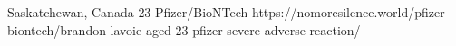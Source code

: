           {Saskatchewan, Canada}
          {23}
          {Pfizer/BioNTech}
          {}
          {
          }
          {https://nomoresilence.world/pfizer-biontech/brandon-lavoie-aged-23-pfizer-severe-adverse-reaction/}

